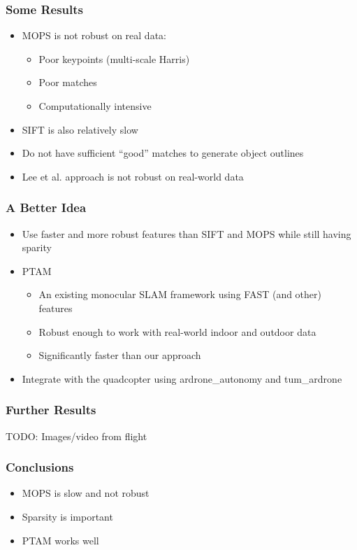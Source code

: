 \documentclass[xcolor=x11names,compress,t]{beamer}
\renewcommand{\(}{\begin{columns}}
\renewcommand{\)}{\end{columns}}
\newcommand{\<}[1]{\begin{column}{#1}}
\renewcommand{\>}{\end{column}}
\begin{document}
\begin{frame}
  \frametitle{Some Results}
  \begin{itemize}
  \item MOPS is not robust on real data:
    \begin{itemize}
    \item Poor keypoints (multi-scale Harris)
    \item Poor matches
    \item Computationally intensive
    \end{itemize}
  \item SIFT is also relatively slow
  \item Do not have sufficient ``good'' matches to generate object outlines
  \item Lee et al. approach is not robust on real-world data
  \end{itemize}
\end{frame}

\begin{frame}
  \frametitle{A Better Idea}
  \begin{itemize}
  \item Use faster and more robust features than SIFT and MOPS while still having sparity
  \item PTAM
    \begin{itemize}
    \item An existing monocular SLAM framework using FAST (and other) features
    \item Robust enough to work with real-world indoor and outdoor data
    \item Significantly faster than our approach
    \end{itemize}
  \item Integrate with the quadcopter using ardrone\_autonomy and tum\_ardrone
  \end{itemize}
\end{frame}

\begin{frame}
  \frametitle{Further Results}
  TODO: Images/video from flight
\end{frame}

\begin{frame}
  \frametitle{Conclusions}
  \begin{itemize}
  \item MOPS is slow and not robust
  \item Sparsity is important
  \item PTAM works well
  \end{itemize}
\end{frame}

\end{document}
